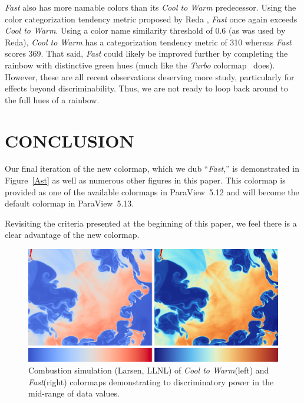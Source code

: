 \documentclass{IEEEcsmag}
\newcommand*{\colormap}[1]{\textsl{#1}\xspace}
\newcommand*{\coolwarm}{\colormap{Cool to Warm}}
\newcommand*{\fast}{\colormap{Fast}}
\newcommand*{\turbo}{\colormap{Turbo}}
\begin{document}
\fast also has more namable colors than its \coolwarm predecessor.
Using the color categorization tendency metric proposed by Reda \cite{Reda2022}, \fast once again exceeds \coolwarm.
Using a color name similarity threshold of 0.6 (as was used by Reda), \coolwarm has a categorization tendency metric of 310 whereas \fast scores 369.
That said, \fast could likely be improved further by completing the rainbow with distinctive green hues (much like the \turbo colormap~\cite{Mikhailov2019} does).
However, these are all recent observations deserving more study, particularly for effects beyond discriminability.
Thus, we are not ready to loop back around to the full hues of a rainbow.


\section{CONCLUSION}

Our final iteration of the new colormap, which we dub ``\fast,'' is demonstrated in Figure~\ref{Ast} as well as numerous other figures in this paper.
This colormap is provided as one of the available colormaps in ParaView~5.12 and will become the default colormap in ParaView~5.13.

Revisiting the criteria presented at the beginning of this paper, we feel there is a clear advantage of the new colormap.


\begin{figure}
\includegraphics[width=\linewidth]{pics/Larsen2.png}
\caption{Combustion simulation (Larsen, LLNL) of \coolwarm (left) and \fast (right) colormaps demonstrating to discriminatory power in the mid-range of data values.}
\label{Larsen}
\end{figure}
\end{document}
